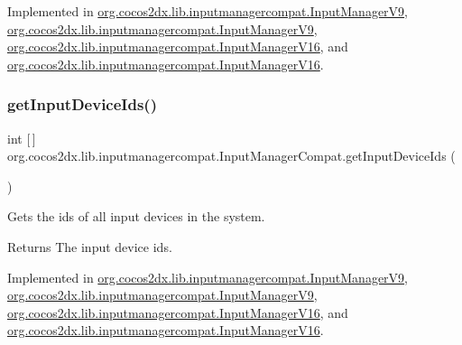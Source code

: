 Implemented in \hyperlink{classorg_1_1cocos2dx_1_1lib_1_1inputmanagercompat_1_1InputManagerV9_a86e8c5b196c4f0707dccc1d0f6b1d0dd}{org.\+cocos2dx.\+lib.\+inputmanagercompat.\+Input\+Manager\+V9}, \hyperlink{classorg_1_1cocos2dx_1_1lib_1_1inputmanagercompat_1_1InputManagerV9_a86e8c5b196c4f0707dccc1d0f6b1d0dd}{org.\+cocos2dx.\+lib.\+inputmanagercompat.\+Input\+Manager\+V9}, \hyperlink{classorg_1_1cocos2dx_1_1lib_1_1inputmanagercompat_1_1InputManagerV16_ab7a4f0ce39114a0c891c2c6642f61e4c}{org.\+cocos2dx.\+lib.\+inputmanagercompat.\+Input\+Manager\+V16}, and \hyperlink{classorg_1_1cocos2dx_1_1lib_1_1inputmanagercompat_1_1InputManagerV16_ab7a4f0ce39114a0c891c2c6642f61e4c}{org.\+cocos2dx.\+lib.\+inputmanagercompat.\+Input\+Manager\+V16}.

\mbox{\label{interfaceorg_1_1cocos2dx_1_1lib_1_1inputmanagercompat_1_1InputManagerCompat_a1601bfbe1b4871a935d49a2a4094e5ac}} 
\subsubsection{\texorpdfstring{get\+Input\+Device\+Ids()}{getInputDeviceIds()}\hspace{0.1cm}{\footnotesize\ttfamily [1/2]}}
{\footnotesize\ttfamily int \mbox{[}$\,$\mbox{]} org.\+cocos2dx.\+lib.\+inputmanagercompat.\+Input\+Manager\+Compat.\+get\+Input\+Device\+Ids (\begin{DoxyParamCaption}{ }\end{DoxyParamCaption})}

Gets the ids of all input devices in the system.

\begin{DoxyReturn}{Returns}
The input device ids. 
\end{DoxyReturn}


Implemented in \hyperlink{classorg_1_1cocos2dx_1_1lib_1_1inputmanagercompat_1_1InputManagerV9_a86d73356f6ea15f86459dcfbf70fa23e}{org.\+cocos2dx.\+lib.\+inputmanagercompat.\+Input\+Manager\+V9}, \hyperlink{classorg_1_1cocos2dx_1_1lib_1_1inputmanagercompat_1_1InputManagerV9_a86d73356f6ea15f86459dcfbf70fa23e}{org.\+cocos2dx.\+lib.\+inputmanagercompat.\+Input\+Manager\+V9}, \hyperlink{classorg_1_1cocos2dx_1_1lib_1_1inputmanagercompat_1_1InputManagerV16_a41ff1ae73d68436be41859a4ac5f2e62}{org.\+cocos2dx.\+lib.\+inputmanagercompat.\+Input\+Manager\+V16}, and \hyperlink{classorg_1_1cocos2dx_1_1lib_1_1inputmanagercompat_1_1InputManagerV16_a41ff1ae73d68436be41859a4ac5f2e62}{org.\+cocos2dx.\+lib.\+inputmanagercompat.\+Input\+Manager\+V16}.

